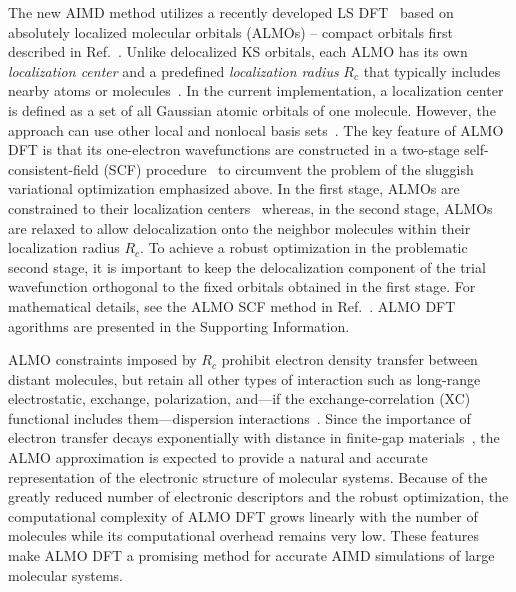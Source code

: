 \documentclass[aip,jcp,reprint,amsmath,amssymb]{revtex4-1}
\begin{document}
The new AIMD method utilizes a recently developed LS DFT~\cite{a:almo-ls} based on absolutely localized molecular orbitals (\mbox{ALMOs}) -- compact orbitals first described in Ref.~. 
Unlike delocalized KS orbitals, each \mbox{ALMO} has its own \emph{localization center} and a predefined \emph{localization radius} $R_{c}$ that typically includes nearby atoms or molecules~\cite{a:stoll,a:almo-ls}. 
In the current implementation, a localization center is defined as a set of all Gaussian atomic orbitals of one molecule. 
However, the approach can use other local and nonlocal basis sets~\cite{a:galli_loc, Lin2012}. 
The key feature of ALMO DFT is that its one-electron wavefunctions are constructed in a two-stage self-consistent-field (SCF) procedure~\cite{a:almo-ls} to circumvent the problem of the sluggish variational optimization emphasized above. 
In the first stage, ALMOs are constrained to their localization centers~\cite{a:khal} whereas, in the second stage, ALMOs are relaxed to allow delocalization onto the neighbor molecules within their localization radius $R_{c}$. 
To achieve a robust optimization in the problematic second stage, it is important to keep the delocalization component of the trial wavefunction orthogonal to the fixed orbitals obtained in the first stage. 
For mathematical details, see the ALMO SCF method in Ref.~. ALMO DFT agorithms are presented in the Supporting Information. 

ALMO constraints imposed by $R_c$ prohibit electron density transfer between distant molecules, but retain all other types of interaction such as long-range electrostatic, exchange, polarization, and---if the exchange-correlation (XC) functional includes them---dispersion interactions~\cite{a:theeda}. 
Since the importance of electron transfer decays exponentially with distance in finite-gap materials~\cite{a:ls-rev-1999}, the \mbox{ALMO} approximation is expected to provide a natural and accurate representation of the electronic structure of molecular systems. %
Because of the greatly reduced number of electronic descriptors and the robust optimization, the computational complexity of ALMO DFT grows linearly with the number of molecules while its computational overhead remains very low. These features make ALMO DFT a promising method for accurate AIMD simulations of large molecular systems.
\end{document}
